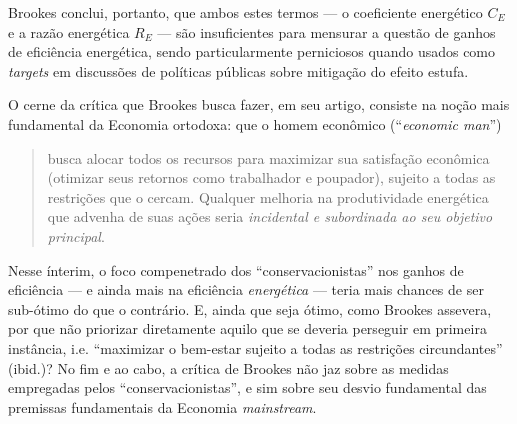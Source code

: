 Brookes conclui, portanto, que ambos estes termos --- o coeficiente energético $C_E$ e a razão energética $R_E$ --- são insuficientes para mensurar a questão de ganhos de eficiência energética, sendo particularmente perniciosos quando usados como \textit{targets} em discussões de políticas públicas sobre mitigação do efeito estufa.

O cerne da crítica que Brookes busca fazer, em seu artigo, consiste na noção mais fundamental da Economia ortodoxa: que o homem econômico (``\textit{economic man}'') 
\begin{quote}
    busca alocar todos os recursos para maximizar sua satisfação econômica (otimizar seus retornos como trabalhador e poupador), sujeito a todas as restrições que o cercam. Qualquer melhoria na produtividade energética que advenha de suas ações seria \textit{incidental e subordinada ao seu objetivo principal}. \parencite[p. 328, grifo meu]{Brookes1990}
\end{quote}
Nesse ínterim, o foco compenetrado dos ``conservacionistas'' nos ganhos de eficiência --- e ainda mais na eficiência \textit{energética} --- teria mais chances de ser sub-ótimo do que o contrário. E, ainda que seja ótimo, como Brookes assevera, por que não priorizar diretamente aquilo que se deveria perseguir em primeira instância, i.e. ``maximizar o bem-estar sujeito a todas as restrições circundantes'' (ibid.)? No fim e ao cabo, a crítica de Brookes não jaz sobre as medidas empregadas pelos ``conservacionistas'', e sim sobre seu desvio fundamental das premissas fundamentais da Economia \textit{mainstream}. 



